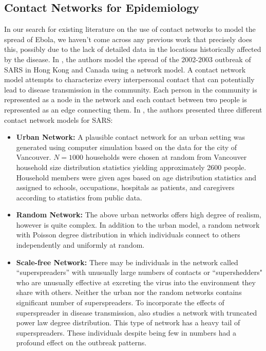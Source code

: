 \documentclass[10pt, journal,onecolumn]{IEEEtran}
\begin{document}
\subsection{\textbf{Contact Networks for Epidemiology \citep{meyers2005network}}}

In our search for existing literature on the use of contact networks to model the spread of Ebola, we haven't come
across any previous work that precisely does this, possibly due to the lack of detailed data in the
locations historically affected by the disease.
In \citep{meyers2005network}, the authors model the spread of the 2002-2003
outbreak of SARS in Hong Kong and Canada using a network model. A contact network model attempts to
characterize every interpersonal contact that can potentially lead to disease transmission in the
community. Each person in the community is represented as a node in the network and each contact between
two people is represented as an edge connecting them.
In \citep{meyers2005network}, the authors presented three different contact network models for SARS:

\begin{itemize}
\item \textbf{Urban Network:} A plausible contact network for an urban setting was generated using
  computer simulation based on the data for the city of Vancouver. $N=1000$
  households were chosen at random from Vancouver household size distribution statistics yielding
  approximately 2600 people. Household members were given ages based on age distribution
  statistics and assigned to schools, occupations, hospitals as patients, and caregivers according
  to statistics from public data.
\item \textbf{Random Network:} The above urban networks offers high degree of realism, however is quite complex. In
  addition to the urban model, a random network with Poisson degree distribution in which
  individuals connect to others independently and uniformly at random.
\item \textbf{Scale-free Network:} There may be individuals in the network called ``superspreaders''
  with unusually large numbers of contacts or ``supershedders" who are unusually effective at
  excreting the virus into the environment they share with others. Neither the urban nor the random
  networks contains significant number of superspreaders. To incorporate the effects of
  superspreader in disease transmission, \citep{meyers2005network} also studies a network with
  truncated power law degree distribution. This type of network has a heavy tail of superspreaders.
  These individuals despite being few in numbers had a profound effect on the outbreak patterns.
\end{itemize}
\end{document}
